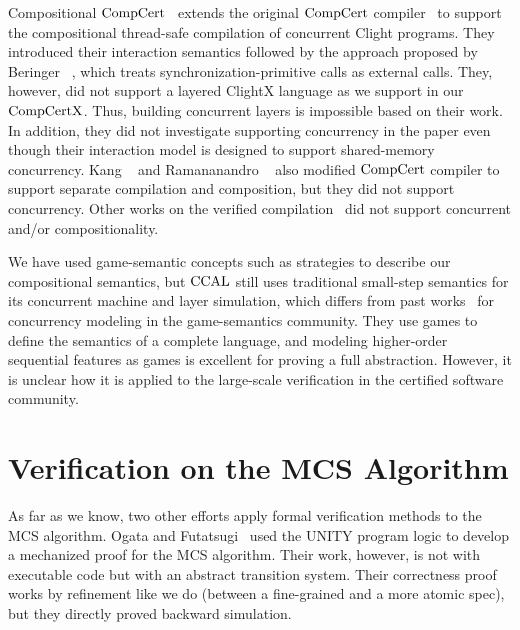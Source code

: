 Compositional $\mathrm{CompCert}$~\cite{stewart15} extends the original $\mathrm{CompCert}$ compiler~\cite{compcert}  
to support the compositional thread-safe compilation of concurrent Clight programs. 
They introduced their interaction semantics followed by the approach proposed by Beringer \etal~\cite{beringer14}, which treats
synchronization-primitive calls as external calls.
They, however, did not support a layered ClightX language as we support in our $\mathrm{CompCertX}$.  
Thus, building concurrent layers is impossible based on their work.
In addition, they did not investigate  supporting concurrency in the paper even though 
their interaction model is designed to support shared-memory concurrency.
Kang \etal~\cite{hur16} and Ramananandro \etal~\cite{ramananandro:2015} also modified $\mathrm{CompCert}$ compiler to support separate compilation and composition, 
but they did not support concurrency.  
Other works on the verified compilation~\cite{Lochbihler10esop, Sevcik11popl, zhao:2013, kang:2018} did not support concurrent and/or compositionality. 


We have used
game-semantic concepts such as strategies to describe our
compositional semantics, 
but $\mathrm{CCAL}$ still uses traditional small-step semantics for its concurrent machine and layer simulation, which differs from 
past works~\cite{ghica08,nishimura13,rideau11,abramsky99}  for concurrency modeling in the game-semantics community.
They use games to
define the semantics of a complete language, 
and modeling higher-order sequential features as games is excellent for proving a full abstraction. 
However, it is unclear how it is applied to the large-scale verification in the certified software community.


\section{Verification on the MCS Algorithm}
\label{chatper:related:sec:verification-on-the-mcs-algorithm}

As far as we know, two other efforts apply formal verification methods
to the MCS algorithm.  Ogata and Futatsugi~\cite{ogata:mcs-lock} used the UNITY program logic to develop a mechanized proof for the MCS algorithm.
Their work, however, is not with executable code but with an abstract transition system. Their correctness proof works by refinement like we do (between a fine-grained and a more atomic spec), but they directly proved backward simulation.

